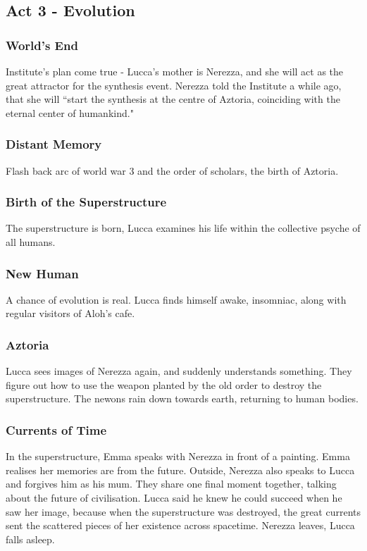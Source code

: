 \documentclass[11pt]{article}
\begin{document}
	\subsection{Act 3 - Evolution}
		\subsubsection{World's End}
		Institute's plan come true - Lucca's mother is Nerezza, and she will act as the great attractor for the synthesis event.
		Nerezza told the Institute a while ago, that she will ``start the synthesis at the centre of Aztoria, coinciding with the eternal center of humankind."
		\subsubsection{Distant Memory}
		Flash back arc of world war 3 and the order of scholars, the birth of Aztoria.
		\subsubsection{Birth of the Superstructure}
		The superstructure is born, Lucca examines his life within the collective psyche of all humans. 
		\subsubsection{New Human}
		A chance of evolution is real. 
		Lucca finds himself awake, insomniac, along with regular visitors of Aloh's cafe.
		\subsubsection{Aztoria}
		Lucca sees images of Nerezza again, and suddenly understands something.
		They figure out how to use the weapon planted by the old order to destroy the superstructure.
		The newons rain down towards earth, returning to human bodies.
		\subsubsection{Currents of Time}
		In the superstructure, Emma speaks with Nerezza in front of a painting.
		Emma realises her memories are from the future.
		Outside, Nerezza also speaks to Lucca and forgives him as his mum.
		They share one final moment together, talking about the future of civilisation.
		Lucca said he knew he could succeed when he saw her image, because when the superstructure was destroyed, the great currents sent the scattered pieces of her existence across spacetime.
		Nerezza leaves, Lucca falls asleep.
\end{document}
